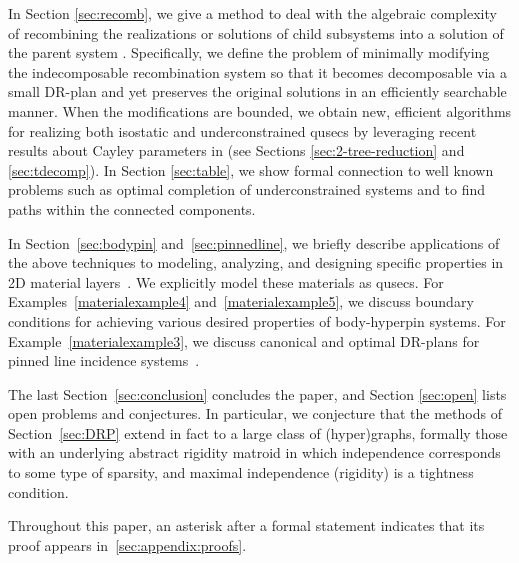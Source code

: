 In Section \ref{sec:recomb}, we give a method to deal with the algebraic complexity of recombining the realizations or solutions of child subsystems into a solution of the parent system \cite{sitharam2010optimized,sitharam2006well,sitharam2010reconciling}. Specifically, we define the problem of minimally modifying the indecomposable recombination system so that it becomes decomposable via a small DR-plan and yet preserves the original solutions in an efficiently searchable manner.
%
When the modifications are bounded, we obtain new, efficient algorithms for realizing both isostatic and underconstrained qusecs by leveraging recent results about Cayley parameters in \cite{sitharam2010convex,sitharam2011cayleyI,sitharam2011cayleyII} (see Sections \ref{sec:2-tree-reduction} and \ref{sec:tdecomp}).
%
In Section \ref{sec:table}, we show formal connection to well known problems such as optimal completion of underconstrained systems \cite{joan-arinyo2003transforming,sitharam2005combinatorial,gao2006ctree} and to find paths within the connected components.



In Section~\ref{sec:bodypin} and~\ref{sec:pinnedline}, we briefly describe applications of the above techniques to modeling, analyzing, and designing specific properties in 2D material layers~\cite{Jackson2008bodypin}. We explicitly model these materials as qusecs. For Examples~\ref{materialexample4} and~\ref{materialexample5}, we discuss boundary conditions for achieving various desired properties of body-hyperpin systems. For Example~\ref{materialexample3}, we discuss canonical and optimal DR-plans for pinned line incidence systems~\cite{sitharam2014incidence}.

The last Section~\ref{sec:conclusion} concludes the paper, and Section \ref{sec:open} lists open problems and conjectures. In particular, we conjecture that the methods of Section~\ref{sec:DRP} extend in fact to a large class of (hyper)graphs, formally those with an underlying abstract rigidity matroid in which independence corresponds to some type of sparsity, and maximal independence (rigidity) is a tightness condition.

Throughout this paper,  an asterisk after a formal statement indicates that its proof appears in~\ref{sec:appendix:proofs}.



